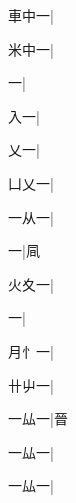 \begin{multicols}{2}
{{\cjk{}車中一}\mktsJzrVerticalBar{}{\cjk{}{\cnsym{}　}{\cnsym{}　}{\cnsym{}　}}|{}\par
{\cjk{}米中一}\mktsJzrVerticalBar{}{\cjk{}{\cnsym{}　}{\cnsym{}　}{\cnsym{}　}}|{}\par
{一}\mktsJzrVerticalBar{}{\cjk{}{\cnsym{}　}{\cnsym{}　}{\cnsym{}　}}|{}\par
{\cjk{}{\cnsym{}　}入一}\mktsJzrVerticalBar{}{\cjk{}{\cnsym{}　}{\cnsym{}　}{\cnsym{}　}}|{}\par
{\cjk{}{\cnsym{}　}乂一}\mktsJzrVerticalBar{}{\cjk{}{\cnsym{}　}{\cnsym{}　}{\cnsym{}　}}|{}\par
{\cjk{}凵乂一}|{}\par
{\cjk{}一从一}\mktsJzrVerticalBar{}{\cjk{}{\cnsym{}　}{\cnsym{}　}{\cnsym{}　}}|{}\par
{一}\mktsJzrVerticalBar{}{\cjk{}{\cnsym{}　}{\cnsym{}　}{\cnsym{}　}}|{\cjk{}凬}\par
{\cjk{}火夊一}\mktsJzrVerticalBar{}{\cjk{}{\cnsym{}　}{\cnsym{}　}{\cnsym{}　}}|{}\par
{一}\mktsJzrVerticalBar{}{\cjk{}{\cnsym{}　}{\cnsym{}　}{\cnsym{}　}}|{}\par
{\cjk{}月{忄}一}\mktsJzrVerticalBar{}{\cjk{}{\cnsym{}　}{\cnsym{}　}{\cnsym{}　}}|{}\par
{\cjk{}卄屮一}\mktsJzrVerticalBar{}{\cjk{}{\cnsym{}　}{\cnsym{}　}{\cnsym{}　}}|{}\par
{\cjk{}一厸一}\mktsJzrVerticalBar{}{\cjk{}{\cnsym{}　}{\cnsym{}　}{\cnsym{}　}}|{\cjk{}晉}\par
{\cjk{}一厸一}|{}\par
{\cjk{}一厸一}|{}\par
}
\end{multicols}
